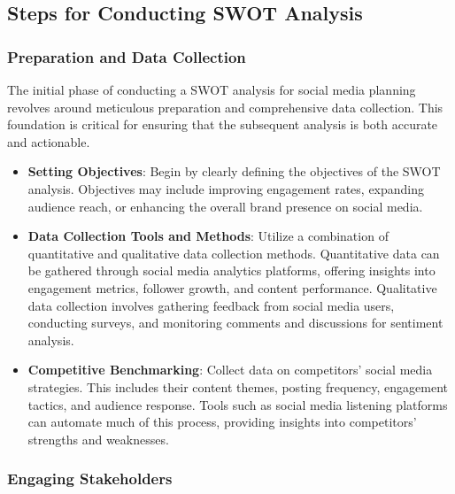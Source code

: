 \documentclass[
]{book}
\providecommand{\tightlist}{%
  \setlength{\itemsep}{0pt}\setlength{\parskip}{0pt}}
\begin{document}
\hypertarget{steps-for-conducting-swot-analysis}{%
\subsection*{Steps for Conducting SWOT Analysis}\label{steps-for-conducting-swot-analysis}}

\hypertarget{preparation-and-data-collection}{%
\subsubsection*{Preparation and Data Collection}\label{preparation-and-data-collection}}

The initial phase of conducting a SWOT analysis for social media planning revolves around meticulous preparation and comprehensive data collection. This foundation is critical for ensuring that the subsequent analysis is both accurate and actionable.

\begin{itemize}
\tightlist
\item
  \textbf{Setting Objectives}: Begin by clearly defining the objectives of the SWOT analysis. Objectives may include improving engagement rates, expanding audience reach, or enhancing the overall brand presence on social media.
\item
  \textbf{Data Collection Tools and Methods}: Utilize a combination of quantitative and qualitative data collection methods. Quantitative data can be gathered through social media analytics platforms, offering insights into engagement metrics, follower growth, and content performance. Qualitative data collection involves gathering feedback from social media users, conducting surveys, and monitoring comments and discussions for sentiment analysis.
\item
  \textbf{Competitive Benchmarking}: Collect data on competitors' social media strategies. This includes their content themes, posting frequency, engagement tactics, and audience response. Tools such as social media listening platforms can automate much of this process, providing insights into competitors' strengths and weaknesses.
\end{itemize}

\hypertarget{engaging-stakeholders}{%
\subsubsection*{Engaging Stakeholders}\label{engaging-stakeholders}}
\end{document}
